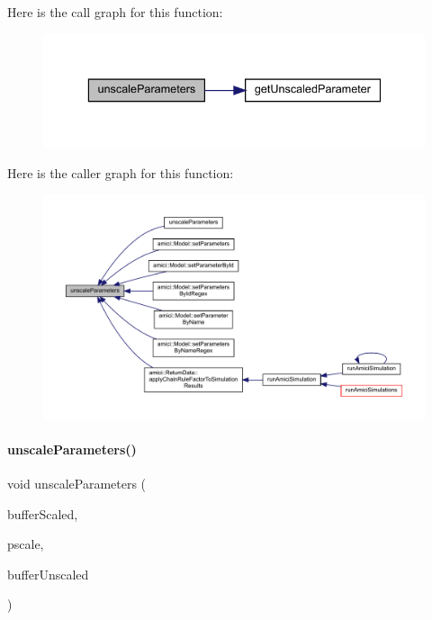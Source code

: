 Here is the call graph for this function\+:
\nopagebreak
\begin{figure}[H]
\begin{center}
\leavevmode
\includegraphics[width=336pt]{namespaceamici_af7d0af67f181a659c78b7aa2bbaaf718_cgraph}
\end{center}
\end{figure}
Here is the caller graph for this function\+:
\nopagebreak
\begin{figure}[H]
\begin{center}
\leavevmode
\includegraphics[width=350pt]{namespaceamici_af7d0af67f181a659c78b7aa2bbaaf718_icgraph}
\end{center}
\end{figure}
\mbox{\label{namespaceamici_a431c1153fbdccf5ab726863030bc2701}} 
\paragraph{\texorpdfstring{unscale\+Parameters()}{unscaleParameters()}\hspace{0.1cm}{\footnotesize\ttfamily [2/2]}}
{\footnotesize\ttfamily void unscale\+Parameters (\begin{DoxyParamCaption}\item[{std\+::vector$<$ double $>$ const \&}]{buffer\+Scaled,  }\item[{std\+::vector$<$ \mbox{\hyperlink{namespaceamici_a42f062082226e9284c201d9eab71a3a0}{Parameter\+Scaling}} $>$ const \&}]{pscale,  }\item[{std\+::vector$<$ double $>$ \&}]{buffer\+Unscaled }\end{DoxyParamCaption})}

